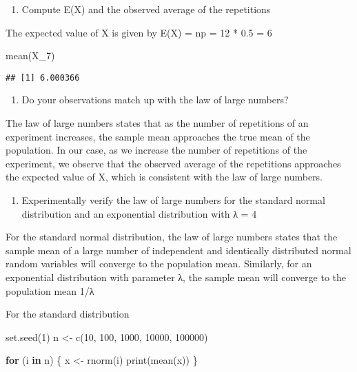 \documentclass[
]{article}
\newenvironment{Shaded}{\begin{snugshade}}{\end{snugshade}}
\newcommand{\ControlFlowTok}[1]{\textcolor[rgb]{0.13,0.29,0.53}{\textbf{#1}}}
\newcommand{\DecValTok}[1]{\textcolor[rgb]{0.00,0.00,0.81}{#1}}
\newcommand{\FunctionTok}[1]{\textcolor[rgb]{0.00,0.00,0.00}{#1}}
\newcommand{\NormalTok}[1]{#1}
\newcommand{\OtherTok}[1]{\textcolor[rgb]{0.56,0.35,0.01}{#1}}
\providecommand{\tightlist}{%
  \setlength{\itemsep}{0pt}\setlength{\parskip}{0pt}}
\begin{document}
\begin{enumerate}
\def\labelenumi{\alph{enumi})}
\setcounter{enumi}{3}
\tightlist
\item
  Compute E(X) and the observed average of the repetitions
\end{enumerate}

The expected value of X is given by E(X) = np = 12 * 0.5 = 6

\begin{Shaded}
\begin{Highlighting}[]
\FunctionTok{mean}\NormalTok{(X\_7)}
\end{Highlighting}
\end{Shaded}

\begin{verbatim}
## [1] 6.000366
\end{verbatim}

\begin{enumerate}
\def\labelenumi{\alph{enumi})}
\setcounter{enumi}{4}
\tightlist
\item
  Do your observations match up with the law of large numbers?
\end{enumerate}

The law of large numbers states that as the number of repetitions of an
experiment increases, the sample mean approaches the true mean of the
population. In our case, as we increase the number of repetitions of the
experiment, we observe that the observed average of the repetitions
approaches the expected value of X, which is consistent with the law of
large numbers.

\begin{enumerate}
\def\labelenumi{\arabic{enumi}.}
\setcounter{enumi}{1}
\tightlist
\item
  Experimentally verify the law of large numbers for the standard normal
  distribution and an exponential distribution with λ = 4
\end{enumerate}

For the standard normal distribution, the law of large numbers states
that the sample mean of a large number of independent and identically
distributed normal random variables will converge to the population
mean. Similarly, for an exponential distribution with parameter λ, the
sample mean will converge to the population mean 1/λ

For the standard distribution

\begin{Shaded}
\begin{Highlighting}[]
\FunctionTok{set.seed}\NormalTok{(}\DecValTok{1}\NormalTok{)}
\NormalTok{n }\OtherTok{\textless{}{-}} \FunctionTok{c}\NormalTok{(}\DecValTok{10}\NormalTok{, }\DecValTok{100}\NormalTok{, }\DecValTok{1000}\NormalTok{, }\DecValTok{10000}\NormalTok{, }\DecValTok{100000}\NormalTok{)}

\ControlFlowTok{for}\NormalTok{ (i }\ControlFlowTok{in}\NormalTok{ n) \{}
\NormalTok{  x }\OtherTok{\textless{}{-}} \FunctionTok{rnorm}\NormalTok{(i)}
  \FunctionTok{print}\NormalTok{(}\FunctionTok{mean}\NormalTok{(x))}
\NormalTok{\}}
\end{Highlighting}
\end{Shaded}
\end{document}
